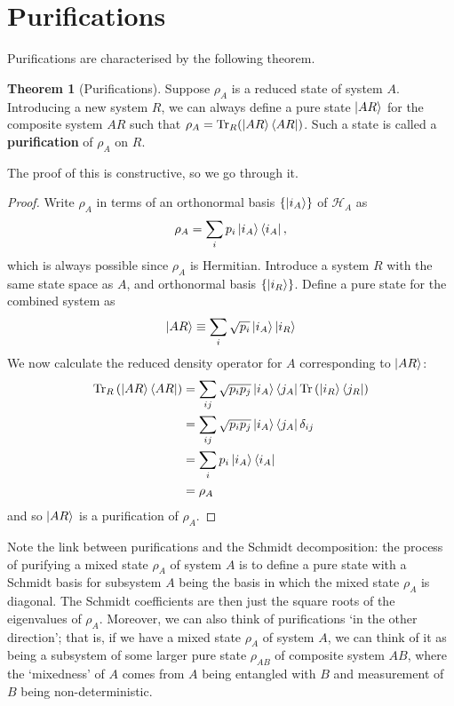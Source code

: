 \documentclass[12pt,a4paper]{report}
\numberwithin{equation}{section}
\newcommand{\ketbra}[2]{\ket{#1}\bra{#2}}
\newcommand{\ketbras}[1]{\ketbra{#1}{#1}}
\newcommand{\tr}{\text{Tr}}
\theoremstyle{definition}
\theoremstyle{theorem}
\newtheorem{theorem}{Theorem}[section]
\theoremstyle{theorem}
\theoremstyle{example}
\theoremstyle{definition}
\begin{document}
\section{Purifications}
Purifications are characterised by the following theorem.
\begin{theorem}[Purifications]\label{P}
	Suppose $\rho_{A}$ is a reduced state of system $A$. Introducing a new system $R$, we can always define a pure state $\ket{AR}$ for the composite system $AR$ such that $\rho_{A}=\tr_{R}(\ketbras{AR})$. Such a state is called a \textbf{purification} of $\rho_{A}$ on $R$.
\end{theorem}
The proof of this is constructive, so we go through it.
\begin{proof}
	Write $\rho_{A}$ in terms of an orthonormal basis $\{\ket{i_{A}}\}$ of $\mathcal{H}_{A}$ as
	\begin{equation}
		\rho_{A}=\sum_{i}p_{i}\ketbras{i_{A}},
	\end{equation}
	which is always possible since $\rho_{A}$ is Hermitian. Introduce a system $R$ with the same state space as $A$, and orthonormal basis $\{\ket{i_{R}}\}$. Define a pure state for the combined system as
	\begin{equation}
		\ket{AR}\equiv\sum_{i}\sqrt{p_{i}}\ket{i_{A}}\ket{i_{R}}
	\end{equation}
	We now calculate the reduced density operator for $A$ corresponding to $\ket{AR}$:
	\begin{equation}
		\begin{aligned}
			\text{Tr}_{R}\left(\ketbras{AR}\right)&=\sum_{ij}\sqrt{p_{i}p_{j}}\ketbra{i_{A}}{j_{A}}\text{Tr}\left(\ketbra{i_{R}}{j_{R}}\right)\\&=\sum_{ij}\sqrt{p_{i}p_{j}}\ketbra{i_{A}}{j_{A}}\delta_{ij}\\
			&=\sum_{i}p_{i}\ketbras{i_{A}}\\&=\rho_{A}
		\end{aligned}
	\end{equation}
	and so $\ket{AR}$ is a purification of $\rho_{A}$.
\end{proof}
Note the link between purifications and the Schmidt decomposition: the process of purifying a mixed state $\rho_{A}$ of system $A$ is to define a pure state with a Schmidt basis for subsystem $A$ being the basis in which the mixed state $\rho_{A}$ is diagonal. The Schmidt coefficients are then just the square roots of the eigenvalues of $\rho_{A}$. Moreover, we can also think of purifications `in the other direction'; that is, if we have a mixed state $\rho_{A}$ of system $A$, we can think of it as being a subsystem of some larger pure state $\rho_{AB}$ of composite system $AB$, where the `mixedness' of $A$ comes from $A$ being entangled with $B$ and measurement of $B$ being non-deterministic.





\end{document}

